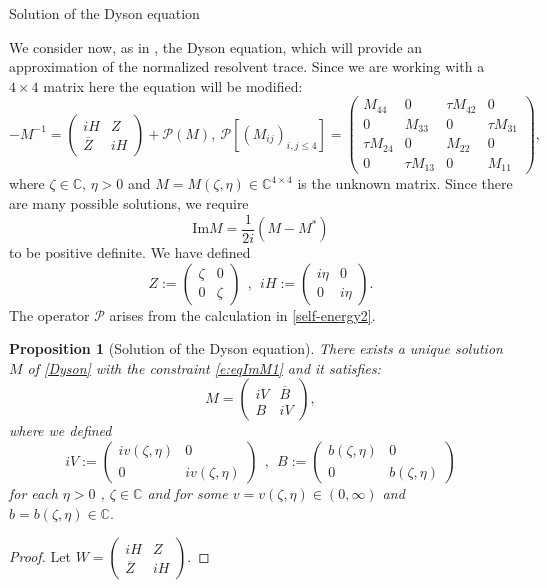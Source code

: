 \documentclass[11pt, a4paper, oneside]{book}
\numberwithin{equation}{chapter}
\newcommand{\beq}{\begin{equation}}
\newcommand{\eeq}{\end{equation}}
\newtheorem{prop}[thm]{Proposition}
\begin{document}
\begin{section}{Solution of the Dyson equation}

We consider now, as in \cite{alt2022local}, the Dyson equation, which will provide an approximation of the normalized resolvent trace. Since we are working with a $4 \times 4$ matrix here the equation will be modified:
%
\beq \label{Dyson}
-M^{-1} = \begin{pmatrix} iH & Z \\ \overline{Z} & iH \end{pmatrix} + \mathscr{P}(M), \ \mathscr{P}\left [ (M_{ij})_{i, j \leq 4} \right] = \begin{pmatrix} M_{44}  & 0  & \tau   M_{42}   & 0 \\ 0  &   M_{33}  & 0 & \tau   M_{31} \\ \tau   M_{24}   & 0 &   M_{22}   & 0   \\ 0 & \tau   M_{13}   & 0   &   M_{11}   \end{pmatrix},
\eeq
%
where $\zeta \in \mathbb{C}$, $\eta>0$ and $M=M(\zeta,\eta)\in \mathbb{C}^{4 \times 4}$ is the unknown matrix. Since there are many possible solutions, we require
%
\begin{equation}\label{e:eqImM1}
\mathrm{Im} M = \frac{1}{2i} (M - M^*)
\end{equation} to be positive definite. We have defined
%
$$ Z := \begin{pmatrix} \zeta & 0 \\ 0 & {\zeta} \end{pmatrix} \  \ , \ \ iH := \begin{pmatrix} i\eta & 0 \\ 0 & i\eta \end{pmatrix} .$$
%
The operator $\mathscr{P}$ arises from the calculation in \eqref{self-energy2}.
%
\begin{prop}[Solution of the Dyson equation] \label{sol-prop}
There exists a unique solution $M$ of \eqref{Dyson} with the constraint \eqref{e:eqImM1} and it satisfies:
%
\beq \label{sol}
M = \begin{pmatrix} iV & \overline{B} \\ B & iV \end{pmatrix},
\eeq
%
where we defined
\begin{equation}\label{e:V,b}
iV := \begin{pmatrix} iv(\zeta,\eta) & 0 \\ 0 & iv(\zeta,\eta) \end{pmatrix} \ \ , \ \ B := \begin{pmatrix}  {b(\zeta,\eta)} & 0 \\ 0 & b(\zeta,\eta) \end{pmatrix}  \end{equation}
%
for each $\eta>0$ , $\zeta \in \mathbb{C}$ and for some $v = v(\zeta,\eta) \in (0,\infty)$ and $b=b(\zeta,\eta) \in \mathbb{C}.$
\end{prop}
%
\begin{proof}
Let $W = \begin{pmatrix} iH & Z \\ \overline{Z} & iH \end{pmatrix}. $ 


\end{proof}
\end{section}
\end{document}
